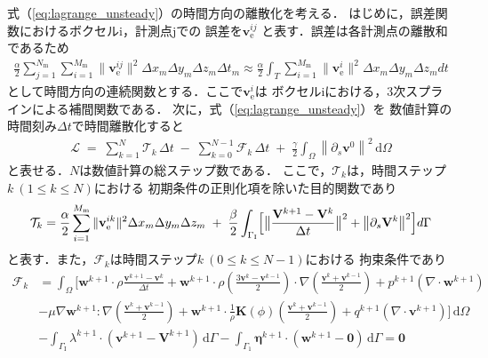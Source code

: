 式（\ref{eq:lagrange_unsteady}）の時間方向の離散化を考える．
はじめに，誤差関数におけるボクセルi，計測点jでの
誤差を$\mathbf{v}^{ij}_{\mathrm{e}}$
と表す．誤差は各計測点の離散和であるため
\begin{equation}
    \label{eq:error_function_spline_interpolated}
    \begin{aligned}
        \frac{\alpha}{2} \sum_{j=1}^{N_\text{m}} \sum_{i=1}^{M_\text{m}} 
        \|\mathbf{v}^{ij}_{\mathrm{e}}\|^2 \Delta x_m \Delta y_m \Delta z_m \Delta t_m
        \approx \frac{\alpha}{2} 
        \int_{T} 
        \sum_{i=1}^{M_\text{m}} 
        \|\mathbf{v}^{i}_{\mathrm{e}}\|^2 
        \Delta x_m \Delta y_m \Delta z_m 
        dt
    \end{aligned}
\end{equation}
として時間方向の連続関数とする．ここで$\mathbf{v}^{i}_{\mathrm{e}}$は
ボクセルiにおける，3次スプラインによる補間関数である．
次に，式（\ref{eq:lagrange_unsteady}）を
数値計算の時間刻み$\Delta t$で時間離散化すると
\begin{align}
    \label{eq:discretized_lagrange_unsteady}
    \mathcal{L} 
    \;=\; \sum_{k=1}^{N} \mathcal{T}_{k} \, \Delta t
    \;-\; \sum_{k=0}^{N-1} \mathcal{F}_{k} \, \Delta t
    \;+\; \frac{\gamma}{2} \int_{\Omega} \left\|\partial_s \mathbf{v}^{0} \right\|^2 \, \mathrm{d}\Omega
\end{align}
と表せる．$N$は数値計算の総ステップ数である．
ここで，$\mathcal{T}_{k}$は，時間ステップ$k \ (1 \leq k \leq N)$における
初期条件の正則化項を除いた目的関数であり
\begin{equation}
    \label{eq:cost_function_discretized}
    \mathcal{T}_{k}
    = \frac{\alpha}{2} 
    \sum_{i=1}^{M_\text{m}} 
    \|\mathbf{v}^{ik}_{\mathrm{e}}\|^2
    \Delta x_m \Delta y_m \Delta z_m 
    \;+\; \frac{\beta}{2}
    \int_{\Gamma_\mathrm{I}} 
    \Bigl[
        \bigl\|\frac{\mathbf{V}^{k+1}-\mathbf{V}^k}{\Delta t}\bigr\|^2
        +
        \bigl\|\partial_s \mathbf{V}^{k}\bigr\|^2
    \Bigr]
    d \Gamma
\end{equation}
と表す．また，$\mathcal{F}_{k}$は時間ステップ$k \ (0 \leq k \leq N-1)$における
拘束条件であり
\begin{equation}
    \label{eq:weak-form-k}
    \begin{aligned}
        \mathcal{F}_{k} & = \int_{\Omega} \bigg[\mathbf{w}^{k+1}
        \cdot \rho \frac{\mathbf{v}^{k+1}-\mathbf{v}^k}{\Delta t} 
        + \mathbf{w}^{k+1} \cdot \rho \left(\frac{3\mathbf{v}^{k} - \mathbf{v}^{k-1}}{2}\right) 
        \cdot \nabla \left(\frac{\mathbf{v}^{k} + \mathbf{v}^{k-1}}{2}\right) + p^{k+1} (\nabla \cdot \mathbf{w}^{k+1}) \\
        &- \mu\nabla\mathbf{w}^{k+1} : \nabla \left(\frac{\mathbf{v}^{k} + \mathbf{v}^{k-1}}{2}\right)
        + \mathbf{w}^{k+1} \cdot \frac{1}{\rho}\mathbf{K}(\phi) \left(\frac{\mathbf{v}^{k} + \mathbf{v}^{k-1}}{2}\right)+ q^{k+1}(\nabla \cdot \mathbf{v}^{k+1})\bigg] \, \mathrm{d}\Omega \\
        &- \int_{\Gamma_{\text{I}}} \lambda^{k+1} \cdot (\mathbf{v}^{k+1} - \mathbf{V}^{k+1}) \, \mathrm{d}\Gamma - \int_{\Gamma_1} \boldsymbol{\eta}^{k+1} \cdot (\mathbf{w}^{k+1} - \mathbf{0}) \, \mathrm{d}\Gamma = \mathbf{0}
    \end{aligned}
\end{equation}
